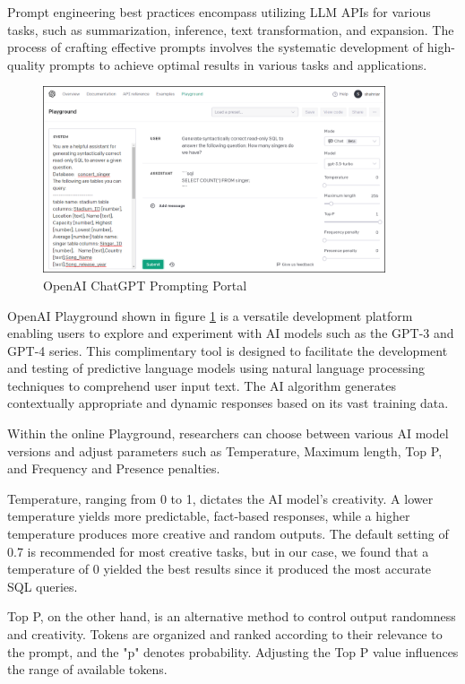 Prompt engineering best practices encompass utilizing LLM APIs for various tasks, such as summarization, inference, text transformation, and expansion. The process of crafting effective prompts involves the systematic development of high-quality prompts to achieve optimal results in various tasks and applications.

\begin{figure}[H]
    \centering
    \includegraphics[width=0.9\textwidth]{pics/openai.png}
    \caption{OpenAI ChatGPT Prompting Portal}
    \label{fig:openai}
\end{figure}

OpenAI Playground shown in figure \ref{fig:openai} is a versatile development platform enabling users to explore and experiment with AI models such as the GPT-3 and GPT-4 series. This complimentary tool is designed to facilitate the development and testing of predictive language models using natural language processing techniques to comprehend user input text. The AI algorithm generates contextually appropriate and dynamic responses based on its vast training data.

Within the online Playground, researchers can choose between various AI model versions and adjust parameters such as Temperature, Maximum length, Top P, and Frequency and Presence penalties.

Temperature, ranging from 0 to 1, dictates the AI model's creativity. A lower temperature yields more predictable, fact-based responses, while a higher temperature produces more creative and random outputs. The default setting of 0.7 is recommended for most creative tasks, but in our case, we found that a temperature of 0 yielded the best results since it produced the most accurate SQL queries.

Top P, on the other hand, is an alternative method to control output randomness and creativity. Tokens are organized and ranked according to their relevance to the prompt, and the "p" denotes probability. Adjusting the Top P value influences the range of available tokens.

